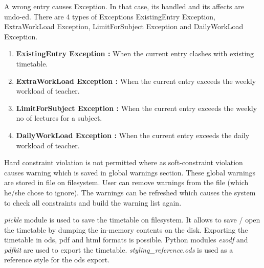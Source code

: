 \begin{algorithm}[H]
\end{algorithm}

A wrong entry causes Exception. In that case, its handled and its affects are undo-ed. There are 4 types of Exceptions ExistingEntry Exception, ExtraWorkLoad Exception, LimitForSubject Exception and DailyWorkLoad Exception.
\begin{enumerate}
\item {\bfseries ExistingEntry Exception :}  When the current entry clashes with existing timetable. 
\item {\bfseries ExtraWorkLoad Exception :} When the current entry exceeds the weekly workload of teacher.
\item {\bfseries LimitForSubject Exception :}  When the current entry exceeds the weekly no of lectures for a subject.
\item {\bfseries DailyWorkLoad Exception :}  When the current entry exceeds the daily workload of teacher.
\end{enumerate}

\newpage Hard constraint violation is not permitted where as soft-constraint violation causes warning which is saved in global warnings section. These global warnings are stored in file on filesystem. User can remove warnings from the file (which he/she chose to ignore). The warnings can be refreshed which causes the system to check all constraints and build the warning list again.

\textit{pickle} module is used to save the timetable on filesystem. It allows to save / open the timetable by dumping the in-memory contents on the disk. Exporting the timetable in ods, pdf and html formats is possible. Python modules \textit{ezodf} and \textit{pdfkit} are used to export the timetable. \textit{styling\_reference.ods} is used as a reference style for the ods export.



 
 
